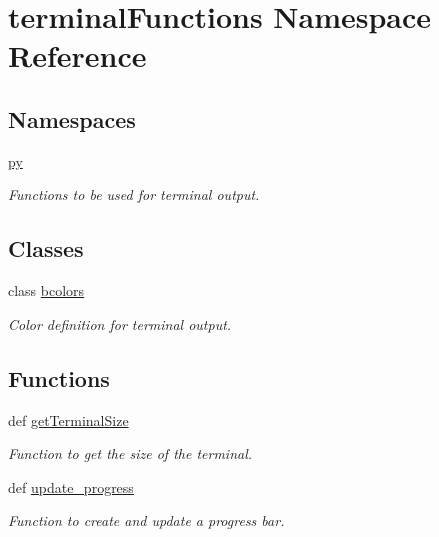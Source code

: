 \section{terminal\-Functions Namespace Reference}
\label{namespaceterminalFunctions}
\subsection*{Namespaces}
\begin{DoxyCompactItemize}
\item 
\hyperlink{namespaceterminalFunctions_1_1py}{py}
\begin{DoxyCompactList}\small\item\em Functions to be used for terminal output. \end{DoxyCompactList}\end{DoxyCompactItemize}
\subsection*{Classes}
\begin{DoxyCompactItemize}
\item 
class \hyperlink{classterminalFunctions_1_1bcolors}{bcolors}
\begin{DoxyCompactList}\small\item\em Color definition for terminal output. \end{DoxyCompactList}\end{DoxyCompactItemize}
\subsection*{Functions}
\begin{DoxyCompactItemize}
\item 
def \hyperlink{namespaceterminalFunctions_ae3b93f09175ae50b228328695278decf}{get\-Terminal\-Size}
\begin{DoxyCompactList}\small\item\em Function to get the size of the terminal. \end{DoxyCompactList}\item 
def \hyperlink{namespaceterminalFunctions_a46633b22d7441adb4eebbe17b896a4cf}{update\-\_\-progress}
\begin{DoxyCompactList}\small\item\em Function to create and update a progress bar. \end{DoxyCompactList}\end{DoxyCompactItemize}


